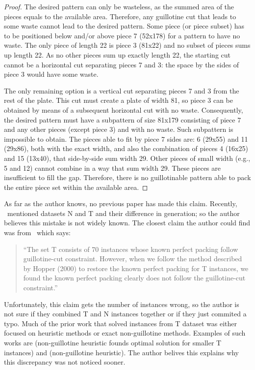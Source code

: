 \noindent
\begin{proof}
The desired pattern can only be wasteless, as the summed area of the pieces equals to the available area.
Therefore, any guillotine cut that leads to some waste cannot lead to the desired pattern.
Some piece (or piece subset) has to be positioned below and/or above piece 7 (52x178) for a pattern to have no waste.
The only piece of length 22 is piece 3 (81x22) and no subset of pieces sums up length 22.
As no other pieces sum up exactly length 22, the starting cut cannot be a horizontal cut separating pieces 7 and 3: the space by the sides of piece 3 would have some waste.

The only remaining option is a vertical cut separating pieces 7 and 3 from the rest of the plate.
This cut must create a plate of width 81, so piece 3 can be obtained by means of a subsequent horizontal cut with no waste.
Consequently, the desired pattern must have a subpattern of size 81x179 consisting of piece 7 and any other pieces (except piece 3) and with no waste.
Such subpattern is impossible to obtain.
The pieces able to fit by piece 7 sides are: 6 (29x55) and 11 (29x86), both with the exact width, and also the combination of pieces 4 (16x25) and 15 (13x40), that side-by-side sum width 29.
Other pieces of small width (e.g., 5 and 12) cannot combine in a way that sum width 29.
These pieces are insufficient to fill the gap.
Therefore, there is no guillotinable pattern able to pack the entire piece set within the available area.

\end{proof}

As far as the author knows, no previous paper has made this claim.
Recently, \citet{what_matters}~mentioned datasets N and T and their difference in generation; so the author believes this mistake is not widely known.
The closest claim the author could find was from~\citet{wei:2014} which says:
\begin{quote}
``The set T consists of 70 instances whose known perfect packing follow guillotine-cut constraint. However, when we follow the method described by Hopper (2000) to restore the known perfect packing for T instances, we found the known perfect packing clearly does not follow the guillotine-cut constraint.''
\end{quote}
Unfortunately, this claim gets the number of instances wrong, so the author is not sure if they combined T and N instances together or if they just commited a typo.
Much of the prior work that solved instances from T dataset was either focused on heuristic methods or exact non-guillotine methods.
Examples of such works are
\citet{alvarez:2008} (non-guillotine heuristic founds optimal solution for smaller T instances) and %
\citet{wei:2011} (non-guillotine heuristic).
The author belives this explains why this discrepancy was not noticed sooner.

